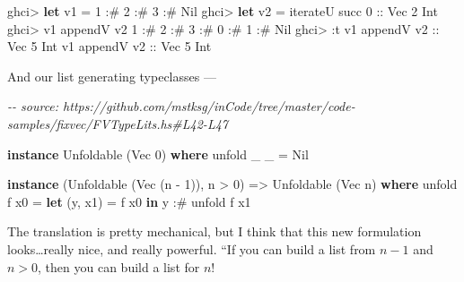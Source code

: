 \documentclass[]{article}
\newenvironment{Shaded}{}{}
\newcommand{\CommentTok}[1]{\textcolor[rgb]{0.38,0.63,0.69}{\textit{#1}}}
\newcommand{\DataTypeTok}[1]{\textcolor[rgb]{0.56,0.13,0.00}{#1}}
\newcommand{\DecValTok}[1]{\textcolor[rgb]{0.25,0.63,0.44}{#1}}
\newcommand{\FunctionTok}[1]{\textcolor[rgb]{0.02,0.16,0.49}{#1}}
\newcommand{\KeywordTok}[1]{\textcolor[rgb]{0.00,0.44,0.13}{\textbf{#1}}}
\newcommand{\NormalTok}[1]{#1}
\newcommand{\OperatorTok}[1]{\textcolor[rgb]{0.40,0.40,0.40}{#1}}
\newcommand{\OtherTok}[1]{\textcolor[rgb]{0.00,0.44,0.13}{#1}}
\begin{document}
\begin{Shaded}
\begin{Highlighting}[]
\NormalTok{ghci}\OperatorTok{\textgreater{}} \KeywordTok{let}\NormalTok{ v1 }\OtherTok{=} \DecValTok{1} \OperatorTok{:\#} \DecValTok{2} \OperatorTok{:\#} \DecValTok{3} \OperatorTok{:\#} \DataTypeTok{Nil}
\NormalTok{ghci}\OperatorTok{\textgreater{}} \KeywordTok{let}\NormalTok{ v2 }\OtherTok{=}\NormalTok{ iterateU }\FunctionTok{succ} \DecValTok{0}\OtherTok{ ::} \DataTypeTok{Vec} \DecValTok{2} \DataTypeTok{Int}
\NormalTok{ghci}\OperatorTok{\textgreater{}}\NormalTok{ v1 }\OtherTok{\textasciigrave{}appendV\textasciigrave{}}\NormalTok{ v2}
\DecValTok{1} \OperatorTok{:\#} \DecValTok{2} \OperatorTok{:\#} \DecValTok{3} \OperatorTok{:\#} \DecValTok{0} \OperatorTok{:\#} \DecValTok{1} \OperatorTok{:\#} \DataTypeTok{Nil}
\NormalTok{ghci}\OperatorTok{\textgreater{}} \OperatorTok{:}\NormalTok{t v1 }\OtherTok{\textasciigrave{}appendV\textasciigrave{} v2 ::} \DataTypeTok{Vec} \DecValTok{5} \DataTypeTok{Int}
\NormalTok{v1 }\OtherTok{\textasciigrave{}appendV\textasciigrave{} v2 ::} \DataTypeTok{Vec} \DecValTok{5} \DataTypeTok{Int}
\end{Highlighting}
\end{Shaded}

And our list generating typeclasses ---

\begin{Shaded}
\begin{Highlighting}[]
\CommentTok{{-}{-} source: https://github.com/mstksg/inCode/tree/master/code{-}samples/fixvec/FVTypeLits.hs\#L42{-}L47}

\KeywordTok{instance} \DataTypeTok{Unfoldable}\NormalTok{ (}\DataTypeTok{Vec} \DecValTok{0}\NormalTok{) }\KeywordTok{where}
\NormalTok{    unfold \_ \_ }\OtherTok{=} \DataTypeTok{Nil}

\KeywordTok{instance}\NormalTok{ (}\DataTypeTok{Unfoldable}\NormalTok{ (}\DataTypeTok{Vec}\NormalTok{ (n }\OperatorTok{{-}} \DecValTok{1}\NormalTok{)), n }\OperatorTok{\textgreater{}} \DecValTok{0}\NormalTok{) }\OtherTok{=\textgreater{}} \DataTypeTok{Unfoldable}\NormalTok{ (}\DataTypeTok{Vec}\NormalTok{ n) }\KeywordTok{where}
\NormalTok{    unfold f x0 }\OtherTok{=} \KeywordTok{let}\NormalTok{ (y, x1) }\OtherTok{=}\NormalTok{ f x0}
                  \KeywordTok{in}\NormalTok{  y }\OperatorTok{:\#}\NormalTok{ unfold f x1}
\end{Highlighting}
\end{Shaded}

The translation is pretty mechanical, but I think that this new formulation
looks\ldots really nice, and really powerful. ``If you can build a list from
\(n - 1\) and \(n > 0\), then you can build a list for \(n\)!
\end{document}
